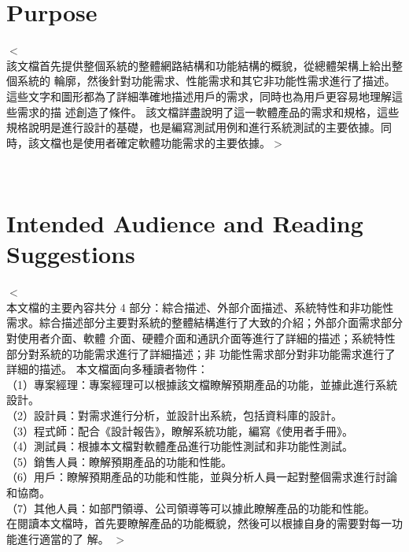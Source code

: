 \documentclass{scrreprt}
\begin{document}
\begin{CJK}{UTF8}{bkai}
\section{Purpose}
$<$\\該文檔首先提供整個系統的整體網路結構和功能結構的概貌，從總體架構上給出整個系統的 輪廓，然後針對功能需求、性能需求和其它非功能性需求進行了描述。這些文字和圖形都為了詳細準確地描述用戶的需求，同時也為用戶更容易地理解這些需求的描 述創造了條件。 該文檔詳盡說明了這一軟體產品的需求和規格，這些規格說明是進行設計的基礎，也是編寫測試用例和進行系統測試的主要依據。同時，該文檔也是使用者確定軟體功能需求的主要依據。$>$

　　　%

\section{Intended Audience and Reading Suggestions}
$<$\\  本文檔的主要內容共分 4 部分：綜合描述、外部介面描述、系統特性和非功能性需求。綜合描述部分主要對系統的整體結構進行了大致的介紹；外部介面需求部分對使用者介面、軟體 介面、硬體介面和通訊介面等進行了詳細的描述；系統特性部分對系統的功能需求進行了詳細描述；非 功能性需求部分對非功能需求進行了詳細的描述。 本文檔面向多種讀者物件：\\ 
（1）專案經理：專案經理可以根據該文檔瞭解預期產品的功能，並據此進行系統設計。 \\
（2）設計員：對需求進行分析，並設計出系統，包括資料庫的設計。 \\
（3）程式師：配合《設計報告》，瞭解系統功能，編寫《使用者手冊》。 \\（4）測試員：根據本文檔對軟體產品進行功能性測試和非功能性測試。 \\（5）銷售人員：瞭解預期產品的功能和性能。 \\
（6）用戶：瞭解預期產品的功能和性能，並與分析人員一起對整個需求進行討論和協商。 \\
（7）其他人員：如部門領導、公司領導等可以據此瞭解產品的功能和性能。 \\
在閱讀本文檔時，首先要瞭解產品的功能概貌，然後可以根據自身的需要對每一功能進行適當的了 解。 
$>$


\end{CJK}
\end{document}
